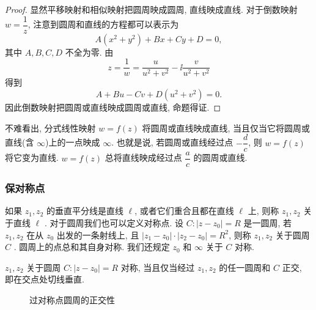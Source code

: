 \begin{proof}
  显然平移映射和相似映射把圆周映成圆周, 直线映成直线.
  对于倒数映射 $w=\dfrac1z$, 注意到圆周和直线的方程都可以表示为
  \[
    A(x^2+y^2)+Bx+Cy+D=0,
  \]
  其中 $A,B,C,D$ 不全为零. 由
  \[
      z
    =\frac1w
    =\frac{u}{u^2+v^2}-\ii \frac{v}{u^2+v^2}
  \]
  得到
  \[
    A+Bu-Cv+D(u^2+v^2)=0.
  \]
  因此倒数映射把圆周或直线映成圆周或直线, 命题得证.
\end{proof}

不难看出, 分式线性映射 $w=f(z)$ 将圆周或直线映成直线, 当且仅当它将圆周或直线(含 $\infty$)上的一点映成 $\infty$.
也就是说, 若圆周或直线经过点 $-\dfrac dc$, 则 $w=f(z)$ 将它变为直线.
$w=f(z)$ 总将直线映成经过点 $\dfrac ac$ 的圆周或直线.


\subsubsection{保对称点}

如果 $z_1,z_2$ 的垂直平分线是直线 $\ell$, 或者它们重合且都在直线 $\ell$ 上, 则称 $z_1,z_2$ 关于直线 $\ell$ .
对于圆周我们也可以定义对称点.
设 $C:|z-z_0|=R$ 是一圆周, 若 $z_1,z_2$ 在从 $z_0$ 出发的一条射线上, 且 $|z_1-z_0|\cdot|z_2-z_0|=R^2$, 则称 $z_1,z_2$ 关于圆周 $C$ .
圆周上的点总和其自身对称.
我们还规定 $z_0$ 和 $\infty$ 关于 $C$ 对称.

\begin{lemma}
  \label{lem:symmetry-circle}
  $z_1,z_2$ 关于圆周 $C:|z-z_0|=R$ 对称, 当且仅当经过 $z_1,z_2$ 的任一圆周和 $C$ 正交, 即在交点处切线垂直.
\end{lemma}

\begin{figure}[!htb]
  \centering
  \caption{过对称点圆周的正交性}
\end{figure}

